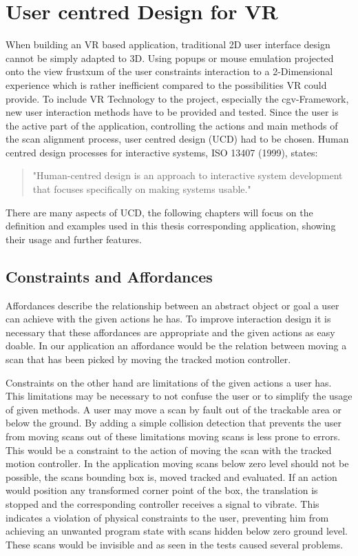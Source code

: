 \documentclass[hyperref,english,bachelorofscience,bibnum,twoside]{cgvpub}
\begin{document}
\section{User centred Design for VR}

When building an VR based application, traditional 2D user interface design cannot be simply adapted to 3D.
Using popups or mouse emulation projected onto the view frustxum of the user constraints interaction to a 2-Dimensional experience which is rather inefficient compared to the possibilities VR could provide.
To include VR Technology to the project, especially the cgv-Framework, new user interaction methods have to be provided and tested. Since the user is the active part of the application, controlling the actions and main methods of the scan alignment process, user centred design (UCD) had to be chosen. 
Human centred design processes for interactive systems, ISO 13407 (1999), states: 
\begin{quote}
"Human-centred design is an approach to interactive system development that focuses specifically on making systems usable."\cite{w3ucdISO}
\end{quote}
There are many aspects of UCD, the following chapters will focus on the definition and examples used in this thesis corresponding application, showing their usage and further features.

\subsection{Constraints and Affordances}

Affordances describe the relationship between an abstract object or goal a user can achieve with the given actions he has\cite{Jerald2015}.
To improve interaction design it is necessary that these affordances are appropriate and the given actions as easy doable\cite{Jerald2015}.
In our application an affordance would be the relation between moving a scan that has been picked by moving the tracked motion controller. 

Constraints on the other hand are limitations of the given actions a user has. This limitations may be necessary to not confuse the user or to simplify the usage of given methods. A user may move a scan by fault out of the trackable area or below the ground. By adding a simple collision detection that prevents the user from moving scans out of these limitations moving scans is less prone to errors. This would be a constraint to the action of moving the scan with the tracked motion controller. In the application moving scans below zero level should not be possible, the scans bounding box is, moved tracked and evaluated. If an action would position any transformed corner point of the box, the translation is stopped and the corresponding controller receives a signal to vibrate. This indicates a violation of physical constraints to the user, preventing him from achieving an unwanted program state with scans hidden below zero ground level. These scans would be invisible and as seen in the tests caused several problems.
\end{document}
